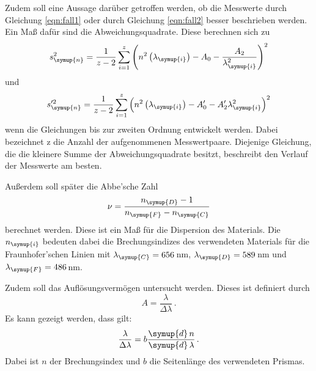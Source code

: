 Zudem soll eine Aussage darüber getroffen werden, ob die Messwerte durch Gleichung
\eqref{eqn:fall1} oder durch Gleichung \eqref{eqn:fall2} besser beschrieben werden. Ein Maß
dafür sind die Abweichungsquadrate. Diese berechnen sich zu
\begin{equation}
  s_{\symup{n}}^2=\frac{1}{z-2}\sum_{i=1}^{z}\left(n^2\left(\lambda_{\symup{i}}\right)
  -A_0-\frac{A_2}{\lambda_{\symup{i}}^2}\right)^2
  \label{eqn:abweichung1}
\end{equation}
und
\begin{equation}
  s_{\symup{n}}'^2=\frac{1}{z-2}\sum_{i=1}^{z}\left(n^2\left(\lambda_{\symup{i}}\right)
  -A_0'-A_2'\lambda_{\symup{i}}^2\right)^2
  \label{eqn:abweichung2}
\end{equation}
wenn die Gleichungen bis zur zweiten Ordnung entwickelt werden. Dabei bezeichnet z
die Anzahl der aufgenommenen Messwertpaare. Diejenige Gleichung, die die kleinere
Summe der Abweichungsquadrate besitzt, beschreibt den Verlauf der Messwerte am besten.

Außerdem soll später die Abbe'sche Zahl
\begin{equation}
  \nu=\frac{n_{\symup{D}}-1}{n_{\symup{F}}-n_{\symup{C}}}
  \label{eqn:abbe}
\end{equation}
berechnet werden. Diese ist ein Maß für die Dispersion des Materials.
Die $n_{\symup{i}}$ bedeuten dabei die Brechungsindizes des
verwendeten Materials für die Fraunhofer'schen Linien mit $\lambda_{\symup{C}}=656\,$nm,
$\lambda_{\symup{D}}=589\,$nm und $\lambda_{\symup{F}}=486\,$nm.

Zudem soll das Auflösungsvermögen untersucht werden. Dieses ist definiert durch
\begin{equation}
  A=\frac{\lambda}{\Delta\lambda} \,.
\end{equation}
Es kann gezeigt werden, dass gilt:
\begin{equation}
  \frac{\lambda}{\Delta\lambda}=b\frac{\symup{d}\,n}{\symup{d}\,\lambda} \,.
  \label{eqn:aufloesung}
\end{equation}
Dabei ist $n$ der Brechungsindex und $b$ die Seitenlänge des verwendeten Prismas.
